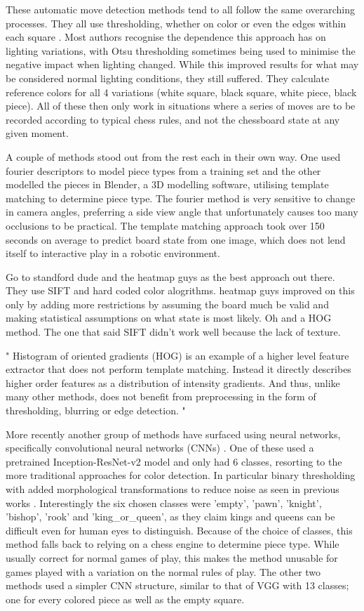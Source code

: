 These automatic move detection methods tend to all follow the same overarching processes.  They all use thresholding, 
whether on color \cite{} or even the edges within each square \cite{}.
Most authors recognise the dependence this approach has on lighting variations, with Otsu thresholding \cite{} sometimes being used to minimise
the negative impact when lighting changed.  While this improved results for what may be considered normal lighting conditions, they still suffered.
They calculate reference colors for all 4 variations (white square, black square, white piece, black piece).
All of these then only work in situations where a series of moves are to be recorded according to typical chess rules, and not the chessboard state at any given moment.

A couple of methods stood out from the rest each in their own way.  One used fourier descriptors to model piece types from a training set
and the other modelled the pieces in Blender, a 3D modelling software, utilising template matching to determine piece type.  The fourier method is very sensitive
to change in camera angles, preferring a side view angle that unfortunately causes too many occlusions to be practical.  The template matching approach
took over 150 seconds on average to predict board state from one image, which does not lend itself to interactive play in a robotic environment.

Go to standford dude and the heatmap guys as the best approach out there. They use SIFT and hard coded color alogrithms.  heatmap guys improved on this
only by adding more restrictions by assuming the board much be valid and making statistical assumptions on
what state is most likely.  Oh and a HOG method.  The one that said SIFT didn't work well because the lack of texture.

"
Histogram of oriented gradients (HOG) is an example of a higher level feature extractor that does not perform template matching.  Instead it directly describes
higher order features as a distribution of intensity gradients.
And thus, unlike many other methods, does not benefit from preprocessing in the form of thresholding, blurring or edge detection.
"

More recently another group of methods have surfaced using neural networks, specifically convolutional neural networks (CNNs) \cite{}.
One of these used a pretrained Inception-ResNet-v2 model \cite{} and only had 6 classes, resorting to the more traditional approaches for color detection.
In particular binary thresholding with added morphological transformations to reduce noise as seen in previous works \cite{}.
Interestingly the six chosen classes were 'empty', 'pawn', 'knight', 'bishop', 'rook' and 'king\_or\_queen', as they claim kings and queens can be
difficult even for human eyes to distinguish.  Because of the choice of classes, this method falls back to relying on a chess engine to determine piece type.
While usually correct for normal games of play, this makes the method unusable for games played with a variation on the normal rules of play.
The other two methods used a simpler CNN structure, similar to that of VGG \cite{} with 13 classes; one for every colored piece as well as the empty square.



